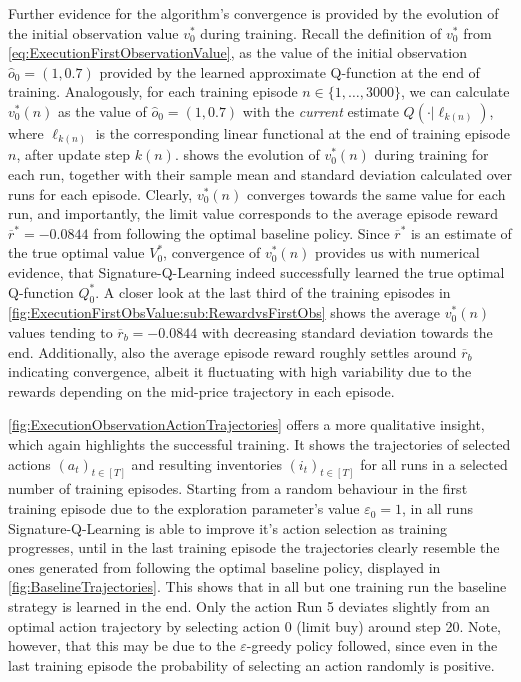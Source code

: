 \documentclass[
    a4paper,
    11pt,
    bibliography=totoc,
    listof=totoc,      
    headinclude=true,
    cleardoublepage=empty,
]{scrbook}
\theoremstyle{plain}
\theoremstyle{definition}
\theoremstyle{remark}
\begin{document}
Further evidence for the algorithm's convergence is provided by the evolution 
of the initial observation value $v_0^*$ during training. Recall the 
definition of $v_0^*$ from \cref{eq:ExecutionFirstObservationValue}, as the 
value of the initial observation $\hat{o}_0 = (1, 0.7)$ provided by the
learned approximate Q-function at the end of training. Analogously, for each 
training episode $n\in\{1,\dots,3000\}$, we can calculate $v_0^*(n)$ as the value of 
$\hat{o}_0 = (1,0.7)$ with the \textit{current} estimate $Q(\cdot |
\ell_{k(n)})$, where $\ell_{k(n)}$ is the corresponding linear functional at 
the end of training episode $n$, after update step $k(n)$. 
 shows 
the evolution of $v_0^*(n)$ during training for each run, together with their 
sample mean and standard deviation calculated over runs for each episode.
Clearly, $v_0^*(n)$ converges towards the same value for each run, and 
importantly, the limit value corresponds to the average episode reward 
$\overline r^* = -0.0844$ from following the optimal baseline policy. Since 
$\overline r^*$ is an estimate of the true optimal value $V_0^*$, convergence 
of $v_0^*(n)$ provides us with numerical evidence, that Signature-Q-Learning 
indeed successfully learned the true optimal Q-function $Q_0^*$. A closer look 
at the last third of the training episodes in 
\cref{fig:ExecutionFirstObsValue:sub:RewardvsFirstObs} shows the average 
$v_0^*(n)$ values tending to $\overline r_b = -0.0844$ with decreasing 
standard deviation towards the end. Additionally, also the average episode 
reward roughly settles around $\overline r_b$ indicating convergence, albeit 
it fluctuating with high variability due to the rewards depending on the 
mid-price trajectory in each episode.

\cref{fig:ExecutionObservationActionTrajectories} offers a more qualitative 
insight, which again highlights the successful training. It shows the 
trajectories of selected actions $(a_t)_{t\in[T]}$ and resulting inventories 
$(i_t)_{t\in[T]}$ for all runs in a selected number of training episodes. 
Starting from a random behaviour in the first training episode due to the 
exploration parameter's value $\varepsilon_0 = 1$, in all runs 
Signature-Q-Learning is able to improve it's action selection as training 
progresses, until in the last training episode 
the trajectories clearly resemble the ones generated from following the 
optimal baseline policy, displayed in \cref{fig:BaselineTrajectories}. This
shows that in all but one training run the baseline strategy is learned in the 
end. Only the action Run 5 deviates slightly from an optimal action trajectory 
by selecting action 0 (limit buy) around step 20. Note, however, that this may 
be due to the $\varepsilon$-greedy policy followed, since even in the last 
training episode the probability of selecting an action randomly is positive. 
\end{document}
